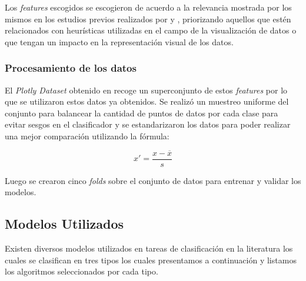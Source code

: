 \documentclass[a4paper,10pt,twocolumn]{article}
\begin{document}
			Los \textit{features} escogidos se escogieron de acuerdo a la relevancia mostrada por los mismos en los estudios
			previos realizados por \cite{hu2019vizml} y \cite{li2021kg4vis}, priorizando aquellos que est\'en relacionados con 
			heur\'isticas utilizadas en el campo de la visualizaci\'on de datos o que tengan un impacto en la representaci\'on 
			visual de los datos.

			\subsubsection{Procesamiento de los datos}

			El \textit{Plotly Dataset} obtenido en \cite{li2021kg4vis} recoge un
			superconjunto de estos \textit{features} por lo que se utilizaron estos datos ya
			obtenidos.
			Se realiz\'o un muestreo uniforme del conjunto para balancear la cantidad de puntos de datos
			por cada clase para evitar sesgos en el clasificador y se estandarizaron los datos
			para poder realizar una mejor comparaci\'on utilizando la f\'ormula:

			$$
				x' = \frac{x - \overline{x}}{s}
			$$
			
			Luego se crearon cinco \textit{folds} sobre el conjunto de datos para entrenar y 
			validar los modelos.
	
	

	\subsection{Modelos Utilizados}
	
	Existen diversos modelos utilizados en tareas de clasificaci\'on en la literatura
	los cuales se clasifican en tres tipos los cuales presentamos a continuaci\'on y listamos
	los algoritmos seleccionados por cada tipo.
\end{document}
